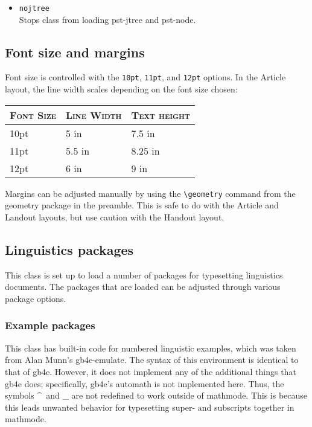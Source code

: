 \documentclass[11pt, tipa, color]{./lingdoc}
\newcommand{\Command}[1]{\texttt{\textbackslash{}#1}}
\newcommand{\Option}[1]{\texttt{#1}}
\newcommand{\Package}[1]{\textsf{{#1}}}
\begin{document}
      \begin{itemize}[leftmargin=0em]
        \item \Option{nojtree} \\ Stops class from loading \Package{pst-jtree} and \Package{pst-node}.
      \end{itemize}

  \subsection{Font size and margins}
  
    Font size is controlled with the \Option{10pt}, \Option{11pt}, and \Option{12pt} options. In the Article layout, the line width scales depending on the font size chosen:
    
      \begin{center}
	\begin{tabular}{lll}
	  \toprule
	    \textsc{Font Size} 	& \textsc{Line Width} 	& \textsc{Text height}\\
	  \midrule
	    10pt		& 5 in			& 7.5 in \\
	    11pt		& 5.5 in 		& 8.25 in \\
	    12pt		& 6 in			& 9 in \\
	  \bottomrule
	\end{tabular}
      \end{center}

    \noindent Margins can be adjusted manually by using the \Command{geometry} command from the \Package{geometry} package in the preamble. This is safe to do with the Article and Landout layouts, but use caution with the Handout layout.

  \subsection{Linguistics packages}
  
    This class is set up to load a number of packages for typesetting linguistics documents. The packages that are loaded can be adjusted through various package options.

  \subsubsection{Example packages}

    This class has built-in code for numbered linguistic examples, which was taken from Alan Munn's \Package{gb4e-emulate}. The syntax of this environment is identical to that of \Package{gb4e}. However, it does not implement any of the additional things that \Package{gb4e} does; specifically, \Package{gb4e}'s automath is not implemented here. Thus, the symbols \textasciicircum\ and \_ are not redefined to work outside of mathmode. This is because this leads unwanted behavior for typesetting super- and subscripts together in mathmode.
  
\end{document}
